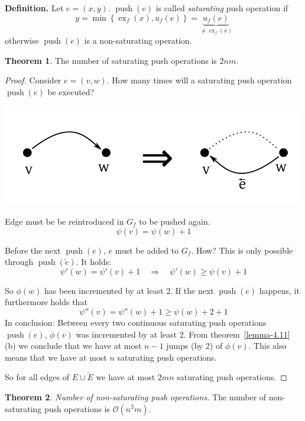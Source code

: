 \documentclass[a4paper]{article}
\theoremstyle{definition}
\newtheorem{theorem}{Theorem}
\newcommand{\set}[1]{\left\{#1\right\}}
\DeclareMathOperator{\push}{push}
\begin{document}
\textbf{Definition.}
  Let $e = (x, y)$. $\push(e)$ is called \emph{saturating} push operation if
  \[ y = \min\set{\operatorname{ex}_f(x), u_f(e)} = \underbrace{u_f(e)}_{\neq \operatorname{ex}_f(x)} \]
  otherwise $\push(e)$ is a non-saturating operation.

\begin{theorem}\label{lemma-4.12}
  The number of saturating push operations is $2nm$.
\end{theorem}

\begin{proof}
  Consider $e = (v, w)$. How many times will a saturating push operation $\push(e)$ be executed?

  \begin{center}
    \includegraphics{img/saturating_push.pdf}
  \end{center}

  Edge must be be reintroduced in $G_f$ to be pushed again.
  \[ \psi(v) = \psi(w) + 1 \]

  Before the next $\push(e)$, $e$ must be added to $G_f$.
  How? This is only possible through $\push(\overleftarrow{e})$. It holds:
  \[
    \psi'(w) = \psi'(v) + 1  \quad\Rightarrow\quad  \psi'(w) \geq \psi(v) + 1
  \]

  So $\phi(w)$ has been incremented by at least 2.
  If the next $\push(e)$ happens, it furthermore holds that
  \[
    \psi''(v) = \psi''(w) + 1 \geq \psi(w) + 2 + 1
  \]
  In conclusion: Between every two continuous saturating push operations $\push(e)$, $\phi(v)$ was incremented by at least 2.
  From theorem~\ref{lemma-4.11} (b) we conclude that we have at most $n-1$ jumps (by 2) of $\phi(v)$. This also means that we have at most $n$ saturating push operations.

  So for all edges of $E \cup \overleftarrow{E}$ we have at most $2mn$ saturating push operations.
\end{proof}

\begin{theorem}\label{lemma-4.13}
  \emph{Number of non-saturating push operations.}
  The number of non-saturating push operations is $\mathcal{O}(n^2m)$.
\end{theorem}
\end{document}
